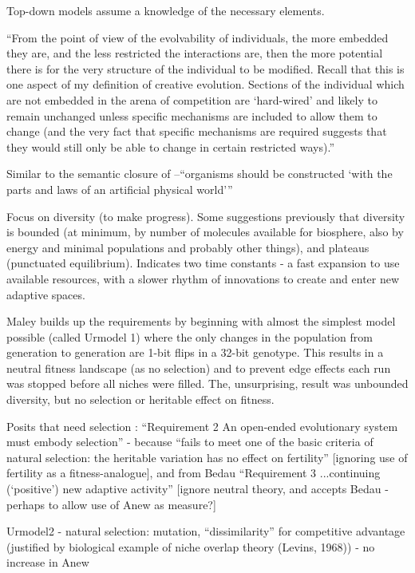 Top-down models assume a knowledge of the necessary elements.

``From the point of view of the evolvability of individuals, the more embedded they are, and the less restricted the interactions are, then the more potential there is for the very structure of the individual to be modified. Recall that this is one aspect of my definition of creative evolution. Sections of the individual which are not embedded in the arena of competition are `hard-wired' and
likely to remain unchanged unless specific mechanisms are included to allow them to change (and the very fact that specific mechanisms are required suggests that they would still only be able to change in certain restricted ways).'' \cite{Taylor2001}

Similar to the semantic closure of \cite{Pattee1995a}--``organisms should be constructed `with the parts and laws of an artificial physical world''' \cite{Taylor2001}

\autocite{Maley1999}

Focus on diversity (to make progress). Some suggestions previously that diversity is bounded (at minimum, by
number of molecules available for biosphere, also by energy and
minimal populations and probably other things), and plateaus
(punctuated equilibrium). Indicates two time constants - a fast expansion to use available resources, with a slower rhythm of innovations to create and enter new adaptive spaces.

Maley builds up the requirements by beginning with almost the simplest model possible (called Urmodel 1) where the only changes in the population from generation to generation are 1-bit flips in a 32-bit genotype. This results in a neutral fitness landscape (as no selection) and to prevent edge effects each run was stopped before all niches were filled. The, unsurprising, result was unbounded diversity, but no selection or heritable effect on fitness.

Posits that need selection : ``Requirement 2 An open-ended
evolutionary system must embody selection'' - because ``fails to meet
one of the basic criteria of natural selection: the heritable
variation has no effect on fertility'' {[}ignoring use of fertility as
a fitness-analogue{]}, and from Bedau ``Requirement 3 ...continuing
(`positive') new adaptive activity'' {[}ignore neutral theory, and
accepts Bedau - perhaps to allow use of Anew as measure?{]}

Urmodel2 - natural selection: mutation, ``dissimilarity'' for
competitive advantage (justified by biological example of niche
overlap theory (Levins, 1968)) - no increase in Anew

